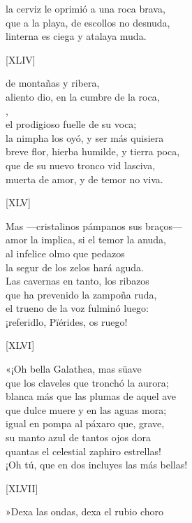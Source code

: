 \documentclass[11pt,a4paper,twoside]{article}
\begin{document}
la cerviz le oprimió a una roca brava,\\
que a la playa, de escollos no desnuda,\\
linterna es ciega y atalaya muda.\pend
\begin{center}
	[XLIV]
\end{center}\pstart
{} de montañas y ribera,\\
aliento dio, en la cumbre de la roca,\\
,\\
el prodigioso fuelle de su voca;\\
la nimpha los oyó, y ser más quisiera\\
breve flor, hierba humilde, y tierra poca,\\
que de su nuevo tronco vid lasciva,\\
muerta de amor, y de temor no viva.\pend
\begin{center}
	[XLV]
\end{center}\pstart
Mas —cristalinos pámpanos sus braços—\\
amor la implica, si el temor la anuda,\\
al infelice olmo que pedazos\\
la segur de los zelos hará aguda.\\
Las cavernas en tanto, los ribazos\\
que ha prevenido la zampoña ruda,\\
el trueno de la voz fulminó luego:\\
¡referidlo, Pïérides, os ruego!\pend
\begin{center}
	[XLVI]
\end{center}\pstart
«¡Oh bella Galathea, mas süave\\
que los claveles que tronchó la aurora;\\
blanca más que las plumas de aquel ave\\
que dulce muere y en las aguas mora;\\
igual en pompa al páxaro que, grave,\\
su manto azul de tantos ojos dora\\
quantas el celestial zaphiro estrellas!\\
¡Oh tú, que en dos incluyes las más bellas!\pend
\begin{center}
	[XLVII]
\end{center}\pstart
»Dexa las ondas, dexa el rubio choro\\
\end{document}
